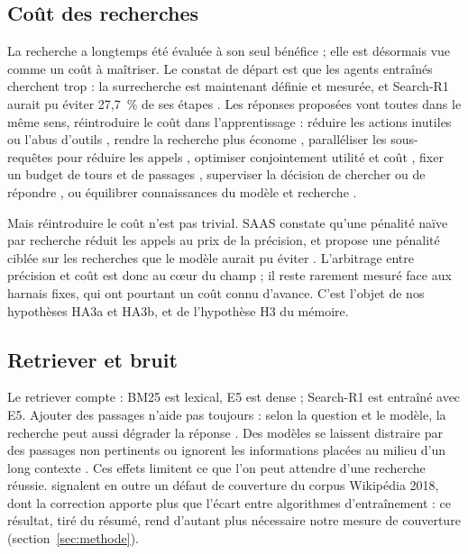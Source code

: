 \documentclass[11pt,a4paper]{article}
\begin{document}
\subsection{Coût des recherches}
La recherche a longtemps été évaluée à son seul bénéfice ; elle est désormais vue comme un coût à maîtriser. Le constat de départ est que les agents entraînés cherchent trop : la surrecherche est maintenant définie et mesurée, et Search-R1 aurait pu éviter 27,7~\% de ses étapes \citep{wu2025search}. Les réponses proposées vont toutes dans le même sens, réintroduire le coût dans l'apprentissage : réduire les actions inutiles \citep{wang2025acting} ou l'abus d'outils \citep{chen2026learning}, rendre la recherche plus économe \citep{sha2025sem}, paralléliser les sous-requêtes pour réduire les appels \citep{zhao2025parallelsearch}, optimiser conjointement utilité et coût \citep{mei2025ai}, fixer un budget de tours et de passages \citep{sun2026adarag}, superviser la décision de chercher ou de répondre \citep{sun2026search}, ou équilibrer connaissances du modèle et recherche \citep{lin2025adasearch}.

Mais réintroduire le coût n'est pas trivial. SAAS constate qu'une pénalité naïve par recherche réduit les appels au prix de la précision, et propose une pénalité ciblée sur les recherches que le modèle aurait pu éviter \citep{tang2026saas}. L'arbitrage entre précision et coût est donc au cœur du champ ; il reste rarement mesuré face aux harnais fixes, qui ont pourtant un coût connu d'avance. C'est l'objet de nos hypothèses HA3a et HA3b, et de l'hypothèse H3 du mémoire.

\subsection{Retriever et bruit}
Le retriever compte : BM25 \citep{robertson2009probabilistic} est lexical, E5 \citep{wang2022text} est dense ; Search-R1 est entraîné avec E5. Ajouter des passages n'aide pas toujours : selon la question et le modèle, la recherche peut aussi dégrader la réponse \citep{maekawa2024retrieval}. Des modèles se laissent distraire par des passages non pertinents \citep{yoran2023making} ou ignorent les informations placées au milieu d'un long contexte \citep{liu2023lost}. Ces effets limitent ce que l'on peut attendre d'une recherche réussie. \citet{zhao2026retrieval} signalent en outre un défaut de couverture du corpus Wikipédia 2018, dont la correction apporte plus que l'écart entre algorithmes d'entraînement : ce résultat, tiré du résumé, rend d'autant plus nécessaire notre mesure de couverture (section~\ref{sec:methode}).
\end{document}
